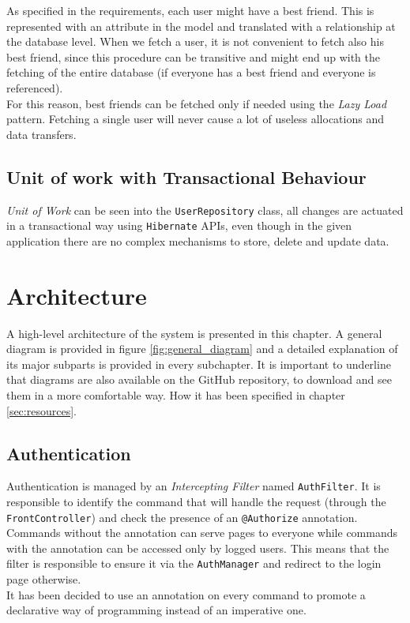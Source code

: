 \documentclass[a4paper]{report}
\begin{document}
	As specified in the requirements, each user might have a best friend. This is represented with an attribute in the model and translated with a relationship at the database level. When we fetch a user, it is not convenient to fetch also his best friend, since this procedure can be transitive and might end up with the fetching of the entire database (if everyone has a best friend and everyone is referenced).\\
	For this reason, best friends can be fetched only if needed using the \textit{Lazy Load} pattern. Fetching a single user will never cause a lot of useless allocations and data transfers.
	
	\section{Unit of work with Transactional Behaviour}
	\label{sec:unit_of_work_transactional}
	
	\textit{Unit of Work} can be seen into the \texttt{UserRepository} class, all changes are actuated in a transactional way using \texttt{Hibernate} APIs, even though in the given application there are no complex mechanisms to store, delete and update data.
	
	\chapter{Architecture}
	\label{cap:architecture}
	
	A high-level architecture of the system is presented in this chapter. A general diagram is provided in figure \ref{fig:general_diagram} and a detailed explanation of its major subparts is provided in every subchapter. It is important to underline that diagrams are also available on the GitHub repository, to download and see them in a more comfortable way. How it has been specified in chapter \ref{sec:resources}.
	
	\section{Authentication}
	\label{sec:authentication}
	
	Authentication is managed by an \textit{Intercepting Filter} named \texttt{AuthFilter}. It is responsible to identify the command that will handle the request (through the \texttt{FrontController}) and check the presence of an \texttt{@Authorize} annotation. Commands without the annotation can serve pages to everyone while commands with the annotation can be accessed only by logged users. This means that the filter is responsible to ensure it via the \texttt{AuthManager} and redirect to the login page otherwise.\\
	It has been decided to use an annotation on every command to promote a declarative way of programming instead of an imperative one.
	
\end{document}
